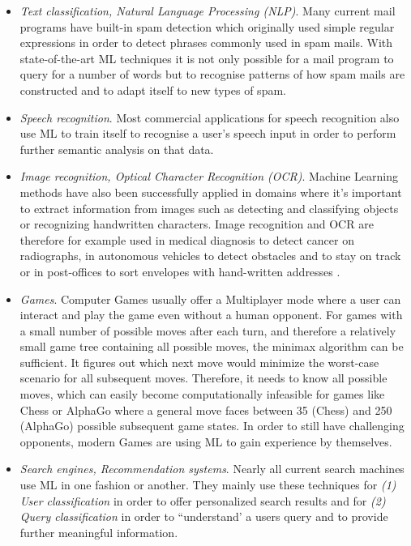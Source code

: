\documentclass[conference]{IEEEtran}
\begin{document}
\begin{itemize}
    \item \textit{Text classification, Natural Language Processing (NLP)}. 
        Many current mail programs have built-in spam detection which originally used
        simple regular expressions in order to detect phrases commonly used in spam mails.
        With state-of-the-art ML techniques it is not only possible for a mail program to 
        query for a number of words but to recognise patterns of how spam mails are constructed and 
        to adapt itself to new types of spam.
    \item \textit{Speech recognition}. 
        Most commercial applications for speech recognition also use ML to train itself to 
        recognise a user's speech input in order to perform further semantic analysis on
        that data.
    \item \textit{Image recognition, Optical Character Recognition (OCR)}.
        Machine Learning methods have also been successfully applied in domains where it's 
        important to extract information from images such as detecting and classifying 
        objects or recognizing handwritten characters. Image 
        recognition and OCR are therefore for example used in medical diagnosis to 
        detect cancer on radiographs, in autonomous vehicles to detect obstacles and to 
        stay on track or in post-offices to sort envelopes with hand-written addresses
        \cite{DisciplineOfML:mitchell}.
    \item \textit{Games}.
        Computer Games usually offer a Multiplayer mode where a user can interact and 
        play the game even without a human opponent. For games with a small number of 
        possible moves after each turn, and therefore a relatively small game tree containing 
        all possible moves, the minimax algorithm\cite{Prog2:bachmaier} can be sufficient. 
        It figures out which next move would minimize the worst-case scenario for all subsequent 
        moves. Therefore, it needs to know all possible moves, which can easily become computationally 
        infeasible for games like Chess or AlphaGo where a general move faces between 35 (Chess) and 
        250 (AlphaGo) possible subsequent game states.
        In order to still have challenging opponents, modern Games are using ML to gain experience 
        by themselves.
    \item \textit{Search engines, Recommendation systems}.
        Nearly all current search machines use ML in one fashion or another. They mainly use these 
        techniques for \textit{(1) User classification}\cite{DisciplineOfML:mitchell} in order to offer personalized 
        search results and for \textit{(2) Query classification} in order to ``understand' a 
        users query and to provide further meaningful information.
\end{itemize}
\end{document}
